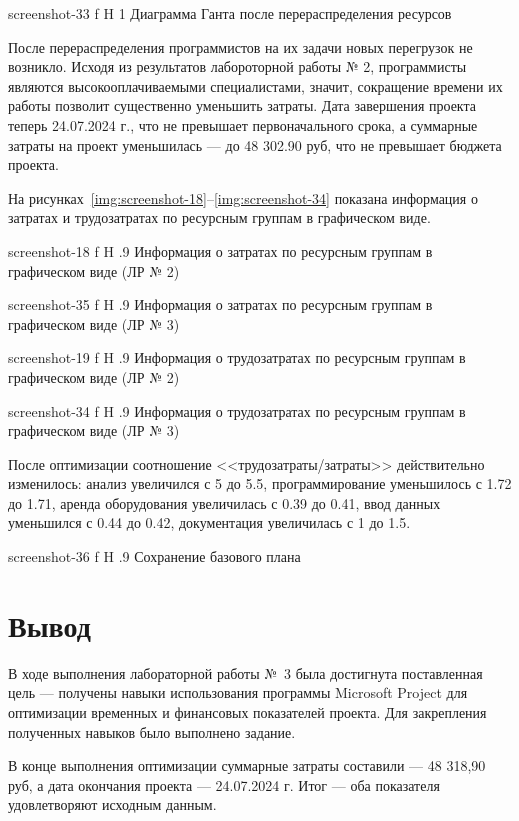 \documentclass{bmstu}
\begin{document}
    {screenshot-33}
    {f}
    {H}
    {1\textwidth}
    {Диаграмма Ганта после перераспределения ресурсов}

После перераспределения программистов на их задачи новых перегрузок не возникло. 
Исходя из результатов лабороторной работы № 2, программисты являются высокооплачиваемыми специалистами, значит, сокращение времени их работы позволит существенно уменьшить затраты. 
Дата завершения проекта теперь 24.07.2024 г., что не превышает первоначального срока, а суммарные затраты на проект уменьшилась --- до 48 302.90 руб, что не превышает бюджета проекта.

На рисунках~\ref{img:screenshot-18}--\ref{img:screenshot-34} показана информация о затратах и трудозатратах по ресурсным группам в графическом виде.

    {screenshot-18}
    {f}
    {H}
    {.9\textwidth}
    {Информация о затратах по ресурсным группам в графическом виде (ЛР № 2)}

    {screenshot-35}
    {f}
    {H}
    {.9\textwidth}
    {Информация о затратах по ресурсным группам в графическом виде (ЛР № 3)}

    {screenshot-19}
    {f}
    {H}
    {.9\textwidth}
    {Информация о трудозатратах по ресурсным группам в графическом виде (ЛР № 2)}

    {screenshot-34}
    {f}
    {H}
    {.9\textwidth}
    {Информация о трудозатратах по ресурсным группам в графическом виде (ЛР № 3)}

После оптимизации соотношение <<трудозатраты/затраты>> действительно изменилось: анализ увеличился с 5 до 5.5, программирование уменьшилось с 1.72 до 1.71, аренда оборудования увеличилась с 0.39 до 0.41, ввод данных уменьшился с 0.44 до 0.42, документация увеличилась с 1 до 1.5.

    {screenshot-36}
    {f}
    {H}
    {.9\textwidth}
    {Сохранение базового плана}

\section{Вывод}

В ходе выполнения лабораторной работы №~3 была достигнута поставленная цель --- получены навыки использования программы Microsoft Project для оптимизации временных и финансовых показателей проекта. 
Для закрепления полученных навыков было выполнено задание.

В конце выполнения оптимизации суммарные затраты составили --- 48 318,90 руб, а дата окончания проекта --- 24.07.2024 г. 
Итог --- оба показателя удовлетворяют исходным данным.
\end{document}
